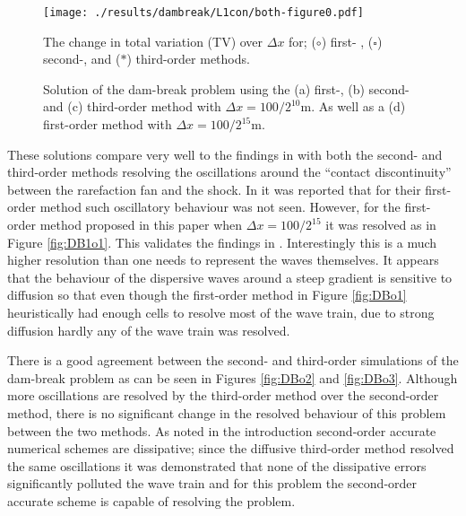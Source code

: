 \documentclass[SingleSpace,12pt,Proceedings]{Serre_ASCE}
\begin{document}
\begin{figure}
\begin{center}
\texttt{[image: ./results/dambreak/L1con/both-figure0.pdf]}
\end{center}
\caption{The change in total variation (TV) over $\Delta x$ for; ($\circ$) first- , ($\square$) second-, and ($*$) third-order methods.}
\label{fig:DBL1}
\end{figure}
\begin{figure}
\centering
{}
\caption{Solution of the dam-break problem using the (a) first-, (b) second- and (c) third-order method with $\Delta x = 100 /2^{10} \text{m}$. As well as a (d) first-order method with $\Delta x = 100 /2^{15} \text{m}$. }
\label{fig:DB}
\end{figure}

These solutions compare very well to the findings in  with both the second- and third-order methods resolving the oscillations around the ``contact discontinuity''\cite{El-etal-2006} between the rarefaction fan and the shock. In  it was reported that for their first-order method such oscillatory behaviour was not seen. However, for the first-order method proposed in this paper when $\Delta x = 100 /2^{15}$ it was resolved as in Figure \ref{fig:DB1o1}. This validates the findings in . Interestingly this is a much higher resolution than one needs to represent the waves themselves. It appears that the behaviour of the dispersive waves around a steep gradient is sensitive to diffusion so that even though the first-order method in Figure \ref{fig:DBo1} heuristically had enough cells to resolve most of the wave train, due to strong diffusion hardly any of the wave train was resolved. 

There is a good agreement between the second- and third-order simulations of the dam-break problem as can be seen in Figures \ref{fig:DBo2} and \ref{fig:DBo3}. Although more oscillations are resolved by the third-order method over the second-order method, there is no significant change in the resolved behaviour of this problem between the two methods. As noted in the introduction second-order accurate numerical schemes are dissipative; since the diffusive third-order method resolved the same oscillations it was demonstrated that none of the dissipative errors significantly polluted the wave train and for this problem the second-order accurate scheme is capable of resolving the problem.
\end{document}

